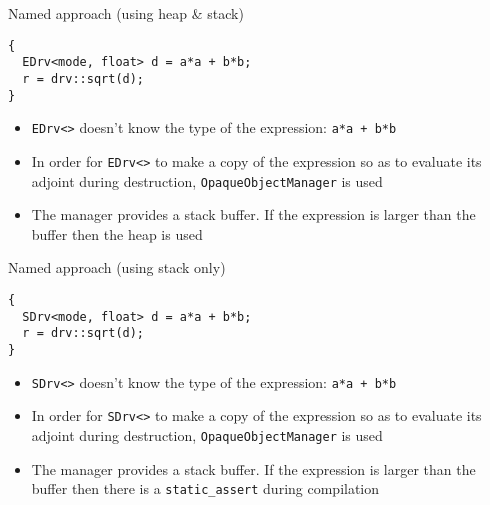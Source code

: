 \documentclass[xcolor=dvipsnames]{beamer}
\begin{document}
\begin{frame}[fragile]{Named approach (using heap \& stack)}
\begin{lstlisting}
{
  EDrv<mode, float> d = a*a + b*b;
  r = drv::sqrt(d);
}
\end{lstlisting}

\begin{itemize}
\item \texttt{EDrv<>} doesn't know the type of the expression: \texttt{a*a + b*b} \vspace{3mm}
\item In order for \texttt{EDrv<>} to make a copy of the expression so as to evaluate its adjoint during destruction, \texttt{OpaqueObjectManager} is used \vspace{3mm}
\item The manager provides a stack buffer. If the expression is larger than the buffer then the heap is used \vspace{3mm}
\end{itemize}
\end{frame}


\begin{frame}[fragile]{Named approach (using stack only)}
\begin{lstlisting}
{
  SDrv<mode, float> d = a*a + b*b;
  r = drv::sqrt(d);
}
\end{lstlisting}

\begin{itemize}
\item \texttt{SDrv<>} doesn't know the type of the expression: \texttt{a*a + b*b} \vspace{3mm}
\item In order for \texttt{SDrv<>} to make a copy of the expression so as to evaluate its adjoint during destruction, \texttt{OpaqueObjectManager} is used \vspace{3mm}
\item The manager provides a stack buffer. If the expression is larger than the buffer then there is a {\color{red}\texttt{static\_assert}} during compilation \vspace{3mm}
\end{itemize}
\end{frame}
\end{document}
